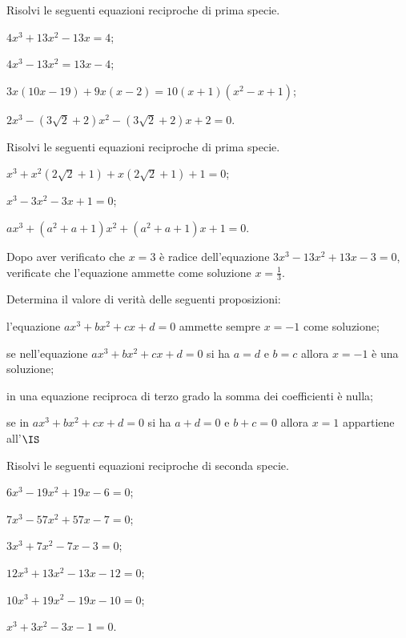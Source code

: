 \begin{esercizio}[\Ast]
\label{ese:5.39}
Risolvi le seguenti equazioni reciproche di prima specie.
\begin{enumeratea}
\item $4x^3+13x^2-13x=4$;
\item $4x^3-13x^2=13x-4$;
\item $3x(10x-19)+9x(x-2)=10(x+1)(x^2-x+1)$;
\item $2x^3-(3\sqrt 2+2)x^2-(3\sqrt 2+2)x+2=0$.
\end{enumeratea}
\end{esercizio}

\begin{esercizio}[\Ast]
\label{ese:5.40}
Risolvi le seguenti equazioni reciproche di prima specie.
\begin{enumeratea}
\item $x^3+x^2(2\sqrt 2+1)+x(2\sqrt 2+1)+1=0$;
\item $x^3-3x^2-3x+1=0$;
\item ${ax}^3+(a^2+a+1)x^2+(a^2+a+1)x+1=0$.
\end{enumeratea}
\end{esercizio}

 \begin{esercizio}[\Ast]
\label{ese:5.41}
Dopo aver verificato che $x=3$ è radice dell'equazione $3x^3-13x^2+13x-3=0$, verificate che l'equazione ammette come soluzione $x=\frac 1 3$.
 \end{esercizio}

\begin{esercizio}
\label{ese:5.42}
Determina il valore di verità delle seguenti proposizioni:
\begin{enumeratea}
\item l'equazione $ax^3+bx^2+cx+d=0$ ammette sempre $x=-1$ come soluzione;
\item se nell'equazione $ax^3+bx^2+cx+d=0$ si ha $a=d$ e $b=c$ allora $x=-1$ è una soluzione;
\item in una equazione reciproca di terzo grado la somma dei coefficienti è nulla;
\item se in $ax^3+bx^2+cx+d=0$ si ha $a+d=0$ e $b+c=0$ allora $x=1$ appartiene all'$\IS$
\end{enumeratea}
\end{esercizio}

\begin{esercizio}[\Ast]
\label{ese:5.43}
Risolvi le seguenti equazioni reciproche di seconda specie.
\begin{multicols}{2}
\begin{enumeratea}
\item $6x^3-19x^2+19x-6=0$;
\item $7x^3-57x^2+57x-7=0$;
\item $3x^3+7x^2-7x-3=0$;
\item $12x^3+13x^2-13x-12=0$;
\item $10x^3+19x^2-19x-10=0$;
\item $x^3+3x^2-3x-1=0$.
\end{enumeratea}
\end{multicols}
\end{esercizio}

